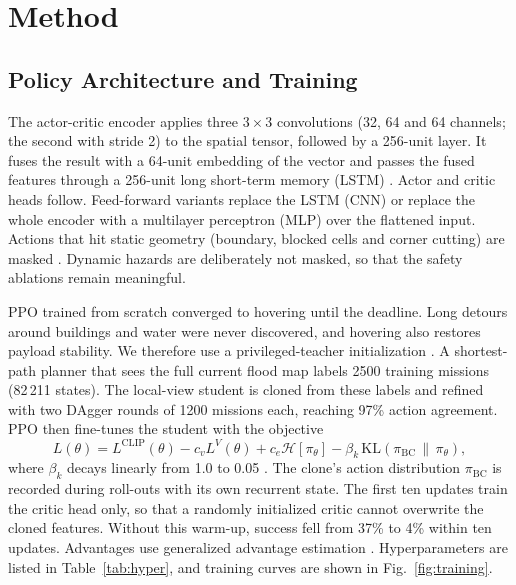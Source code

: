 \documentclass{ieeeaccess}
\begin{document}
\section{Method}
\label{sec:method}

\subsection{Policy Architecture and Training}
The actor-critic encoder applies three $3\times3$ convolutions (32, 64 and 64 channels; the second with stride 2) to the spatial tensor, followed by a 256-unit layer. It fuses the result with a 64-unit embedding of the vector and passes the fused features through a 256-unit long short-term memory (LSTM) \cite{hochreiter1997}. Actor and critic heads follow. Feed-forward variants replace the LSTM (CNN) or replace the whole encoder with a multilayer perceptron (MLP) over the flattened input. Actions that hit static geometry (boundary, blocked cells and corner cutting) are masked \cite{huang2022}. Dynamic hazards are deliberately not masked, so that the safety ablations remain meaningful.

PPO trained from scratch converged to hovering until the deadline. Long detours around buildings and water were never discovered, and hovering also restores payload stability. We therefore use a privileged-teacher initialization \cite{chen2019}. A shortest-path planner \cite{hart1968} that sees the full current flood map labels 2500 training missions (82\,211 states). The local-view student is cloned from these labels and refined with two DAgger rounds \cite{ross2011} of 1200 missions each, reaching 97\% action agreement. PPO \cite{schulman2017} then fine-tunes the student with the objective
\begin{equation}
L(\theta)=L^{\mathrm{CLIP}}(\theta)-c_v L^{V}(\theta)+c_e\mathcal{H}[\pi_\theta]-\beta_k\,\mathrm{KL}\!\left(\pi_{\mathrm{BC}}\,\|\,\pi_\theta\right),
\label{eq:ppo}
\end{equation}
where $\beta_k$ decays linearly from 1.0 to 0.05 \cite{schmitt2018}. The clone's action distribution $\pi_{\mathrm{BC}}$ is recorded during roll-outs with its own recurrent state. The first ten updates train the critic head only, so that a randomly initialized critic cannot overwrite the cloned features. Without this warm-up, success fell from 37\% to 4\% within ten updates. Advantages use generalized advantage estimation \cite{schulman2016}. Hyperparameters are listed in Table~\ref{tab:hyper}, and training curves are shown in Fig.~\ref{fig:training}.
\end{document}
